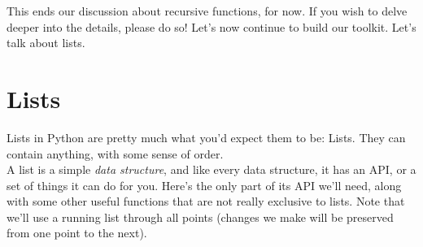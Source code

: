 \documentclass{article}
\begin{document}
\noindent This ends our discussion about recursive functions, for now. If you wish to delve deeper into the details, please do so! Let's now continue to build our toolkit. Let's talk about lists. 

\section{Lists}

Lists in Python are pretty much what you'd expect them to be: Lists. They can contain anything, with some sense of order. \\

\noindent A list is a simple \textit{data structure}, and like every data structure, it has an API, or a set of things it can do for you. Here's the only part of its API we'll need, along with some other useful functions that are not really exclusive to lists. Note that we'll use a running list through all points (changes we make will be preserved from one point to the next).
\end{document}
